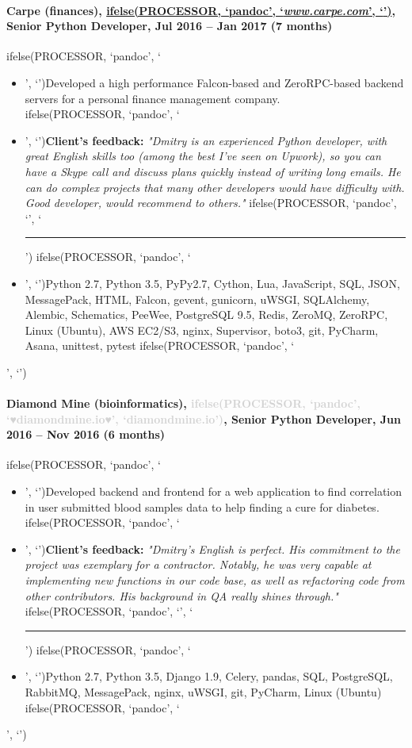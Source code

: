 \documentclass[a4paper,8pt]{extarticle}
\newcommand{\chref}[2]{\href{#1}
{ifelse(PROCESSOR, `pandoc', `#2', `\underline{\smash{#2}}')}}
\newcommand{\itchref}[2]{\chref{#1}{\textit{#2}}}  %
\newcommand{\chrule}{ifelse(PROCESSOR, `pandoc', `', `\vspace{3pt}\hrule')}
\newcommand{\brokenhreflg}[1]{\textcolor{lightgray}{ifelse(PROCESSOR, `pandoc', `♥#1♥', `#1')}}
\newcommand{\pdbeginitemize}{ifelse(PROCESSOR, `pandoc', `\begin{itemize}', `')}
\newcommand{\pditem}{ifelse(PROCESSOR, `pandoc', `\item', `')}
\newcommand{\pdenditemize}{ifelse(PROCESSOR, `pandoc', `\end{itemize}', `')}
\begin{document}
\paragraph*{Carpe (finances), \itchref{https://www.carpe.com}{www.carpe.com}, Senior Python Developer, Jul 2016 -- Jan 2017 (7 months)}
\pdbeginitemize
\pditem Developed a high performance Falcon-based and ZeroRPC-based backend servers for a personal finance management company.\\
\pditem \textbf{Client's feedback:} \textit{"Dmitry is an experienced Python developer, with great English skills too (among the best I've seen on Upwork), so you can have a Skype call and discuss plans quickly instead of writing long emails. He can do complex projects that many other developers would have difficulty with. Good developer, would recommend to others."}
\chrule
\pditem Python 2.7, Python 3.5, PyPy2.7, Cython, Lua, JavaScript, SQL, JSON, MessagePack, HTML, Falcon, gevent, gunicorn, uWSGI, SQLAlchemy, Alembic, Schematics, PeeWee, PostgreSQL 9.5, Redis, ZeroMQ, ZeroRPC, Linux (Ubuntu), AWS EC2/S3, nginx, Supervisor, boto3, git, PyCharm, Asana, unittest, pytest
\pdenditemize

\paragraph*{Diamond Mine (bioinformatics), \brokenhreflg{diamondmine.io}, Senior Python Developer, Jun 2016 -- Nov 2016 (6 months)}
\pdbeginitemize
\pditem Developed backend and frontend for a web application to find correlation in user submitted blood samples data to help finding a cure for diabetes.\\
\pditem \textbf{Client's feedback:} \textit{"Dmitry's English is perfect. His commitment to the project was exemplary for a contractor. Notably, he was very capable at implementing new functions in our code base, as well as refactoring code from other contributors. His background in QA really shines through."}
\chrule
\pditem Python 2.7, Python 3.5, Django 1.9, Celery, pandas, SQL, PostgreSQL, RabbitMQ, MessagePack, nginx, uWSGI, git, PyCharm, Linux (Ubuntu)
\pdenditemize
\end{document}
